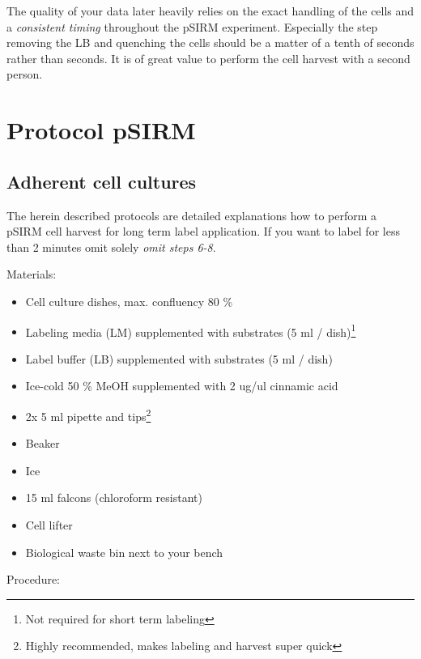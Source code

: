 \documentclass[]{book}
\providecommand{\tightlist}{%
  \setlength{\itemsep}{0pt}\setlength{\parskip}{0pt}}
\let\rmarkdownfootnote\footnote%
\def\footnote{\protect\rmarkdownfootnote}
\theoremstyle{definition}
\theoremstyle{definition}
\theoremstyle{definition}
\theoremstyle{remark}
\begin{document}
The quality of your data later heavily relies on the exact handling of
the cells and a \emph{consistent timing} throughout the pSIRM
experiment. Especially the step removing the LB and quenching the cells
should be a matter of a tenth of seconds rather than seconds. It is of
great value to perform the cell harvest with a second person.

\section{Protocol pSIRM}\label{protocol-psirm}

\hypertarget{psirm:adherent}{\subsection{Adherent cell
cultures}\label{psirm:adherent}}

The herein described protocols are detailed explanations how to perform
a pSIRM cell harvest for long term label application. If you want to
label for less than 2 minutes omit solely \emph{omit steps 6-8}.

Materials:

\begin{itemize}
\tightlist
\item
  Cell culture dishes, max. confluency 80 \%
\item
  Labeling media (LM) supplemented with substrates (5 ml /
  dish)\footnote{Not required for short term labeling}
\item
  Label buffer (LB) supplemented with substrates (5 ml / dish)
\item
  Ice-cold 50 \% MeOH supplemented with 2 ug/ul cinnamic acid
\item
  2x 5 ml pipette and tips\footnote{Highly recommended, makes labeling
    and harvest super quick}
\item
  Beaker
\item
  Ice
\item
  15 ml falcons (chloroform resistant)
\item
  Cell lifter
\item
  Biological waste bin next to your bench
\end{itemize}

Procedure:
\end{document}

